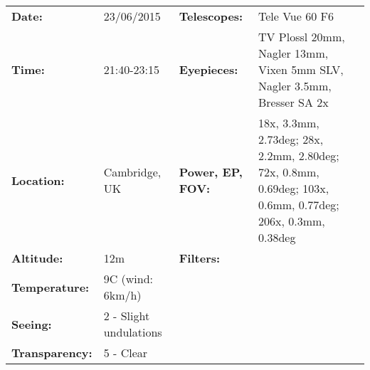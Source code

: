 \begin{tabular}{ p{0.9in} p{1.3in} p{1.2in} p{5.2in}}
{\bf Date:} & 23/06/2015 & {\bf Telescopes:} & Tele Vue 60 F6 \\ 
{\bf Time:} & 21:40-23:15 & {\bf Eyepieces:} & TV Plossl 20mm, Nagler 13mm, Vixen 5mm SLV, Nagler 3.5mm, Bresser SA 2x \\ 
{\bf Location:} & Cambridge, UK & {\bf Power, EP, FOV:} & 18x, 3.3mm, 2.73deg; 28x, 2.2mm, 2.80deg; 72x, 0.8mm, 0.69deg; 103x, 0.6mm, 0.77deg; 206x, 0.3mm, 0.38deg \\ 
{\bf Altitude:} & 12m & {\bf Filters:} &  \\ 
{\bf Temperature:} & 9C (wind: 6km/h) & & \\ 
{\bf Seeing:} & 2 - Slight undulations & & \\ 
{\bf Transparency:} & 5 - Clear & & \\ 
\end{tabular}
\centering 
